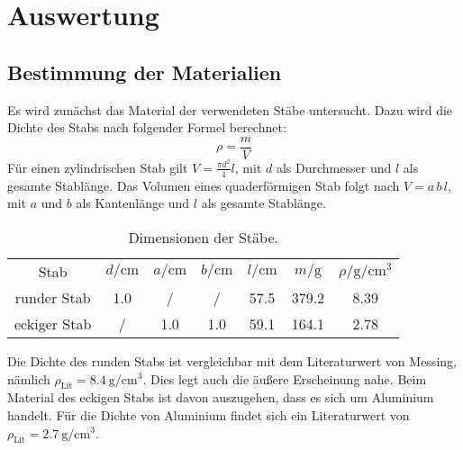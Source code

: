 \section{Auswertung}
\label{sec:Auswertung}
%
\subsection{Bestimmung der Materialien}
Es wird zunächst das Material der verwendeten Stäbe untersucht. Dazu wird die Dichte des Stabs nach
folgender Formel berechnet:
\begin{equation}
    \rho = \frac{m}{V}
\end{equation}
Für einen zylindrischen Stab gilt $V=\frac{\pi d^2}{4}l$, mit $d$ als Durchmesser und $l$ als gesamte Stablänge.
Das Volumen eines quaderförmigen Stab folgt nach $V=a\, b\, l$, mit $a$ und $b$ als Kantenlänge und $l$
als gesamte Stablänge.
%
\begin{table}[H]
    \centering
    \caption{Dimensionen der Stäbe.}
    \label{tab:dim}
    \begin{tabular}{cSSSSSS}
        \toprule
        {Stab} &
        {$d/\si{\centi\meter}$} &
        {$a/\si{\centi\meter}$} &
        {$b/\si{\centi\meter}$} &
        {$l/\si{\centi\meter}$} &
        {$m/\si{\gram}$} &
        {$\rho/\si{\gram\per\centi\meter\cubed}$} \\
        {runder Stab}     & 1.0 & / & / &57.5 & 379.2 & 8.39 \\
        {eckiger Stab}  & / & 1.0 & 1.0 & 59.1 & 164.1 & 2.78  \\
    \end{tabular}
\end{table}
\noindent
Die Dichte des runden Stabs ist vergleichbar mit dem Literaturwert von Messing, nämlich $\rho_\text{Lit} =\SI{8.4}{\gram\per\centi\meter\cubed}$\cite{mess}. Dies legt auch die äußere
Erscheinung nahe. Beim Material des eckigen Stabs ist davon auszugehen, dass es sich um Aluminium handelt.
Für die Dichte von Aluminium findet sich ein Literaturwert von $\rho_\text{Lit} =\SI{2.7}{\gram\per\centi\meter\cubed}$\cite{alu}.
%
